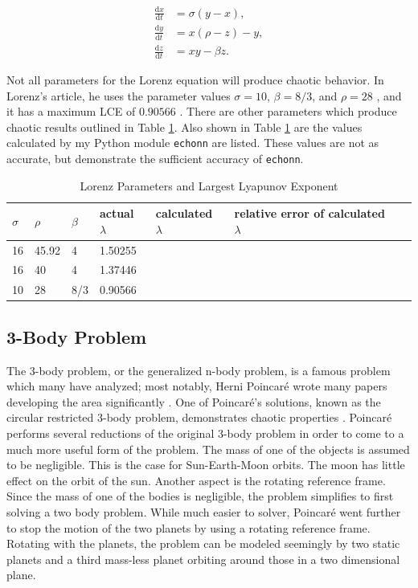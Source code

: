 \documentclass{article}
\newcommand{\der}[2][t]{\frac{\mathrm{d}#2}{\mathrm{d}#1}}
\begin{document}
\begin{align}
    \der{x} &= \sigma (y - x), \nonumber \\
    \der{y} &= x (\rho - z) - y, \nonumber \\
    \der{z} &= x y - \beta z. \label{eq:lorenz_equation}
\end{align}

Not all parameters for the Lorenz equation will produce chaotic behavior. In 
Lorenz's article, he uses the parameter values $\sigma=10$, $\beta=8/3$, and
$\rho=28$ \cite{lorenz1963deterministic}, and it has a maximum LCE of $0.90566$ 
\cite{viswanath1998lyapunov}. There are other parameters which
produce chaotic results outlined in Table \ref{table:lorenz_params}. Also shown 
in Table \ref{table:lorenz_params} are the values calculated by my Python
module \texttt{echonn} are listed. These values are not as accurate, but 
demonstrate the sufficient accuracy of \texttt{echonn}.

\begin{table}[H]
    \centering
    \begin{tabular}{|l|l|l|l|l|l|l|}
        \hline
        $\sigma$ & $\rho$ & $\beta$ & actual $\lambda$ & calculated $\lambda$ & relative error of calculated $\lambda$ \\
        \hline \hline
        16 & 45.92 & 4 & 1.50255 & & \\ %
        16 & 40 & 4 & 1.37446 & & \\
        10 & 28 & 8/3 & 0.90566 & & \\
        \hline
    \end{tabular}
    \caption{
        Lorenz Parameters and Largest Lyapunov Exponent
        \cite{viswanath1998lyapunov}
    }
    \label{table:lorenz_params}
\end{table}

\subsection{3-Body Problem}

The 3-body problem, or the generalized n-body problem, is a famous problem which many have 
analyzed; most notably, Herni Poincaré wrote many papers developing the area significantly
\cite{chenciner2000remarkable}. One of Poincaré's solutions, known as the circular 
restricted 3-body problem, demonstrates chaotic properties \cite{oestreicher2007history}. 
Poincaré performs several reductions of the original 3-body problem in order to come to a 
much more useful form of the problem. The mass of one of the objects is assumed to be 
negligible. This is the case for Sun-Earth-Moon orbits. The moon has little effect on the 
orbit of the sun. Another aspect is the rotating reference frame. Since the mass of one of the bodies is negligible, the problem simplifies to first solving a two body problem. While much easier to solver, Poincaré went further to stop the motion of the two planets by using a rotating reference frame. Rotating with the planets, the problem can be modeled seemingly by two static planets and a third mass-less planet orbiting around those in a two dimensional plane.
\end{document}
